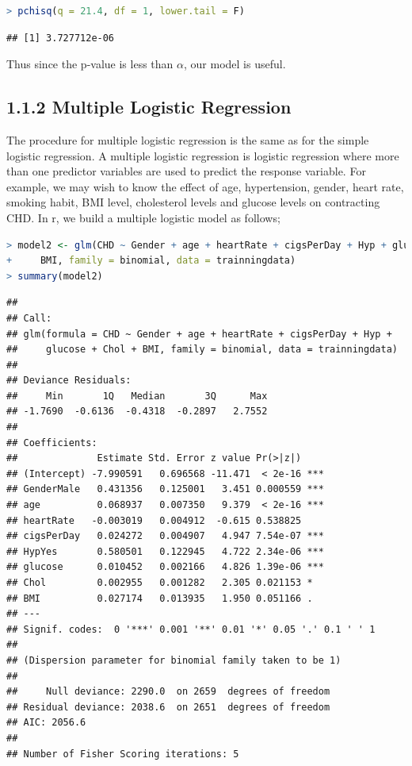 \documentclass[
]{article}
\begin{document}
\begin{lstlisting}[language=R]
> pchisq(q = 21.4, df = 1, lower.tail = F)
\end{lstlisting}

\begin{lstlisting}
## [1] 3.727712e-06
\end{lstlisting}

Thus since the p-value is less than \(\alpha\), our model is useful.

\hypertarget{multiple-logistic-regression}{%
\subsection{1.1.2 Multiple Logistic
Regression}\label{multiple-logistic-regression}}

The procedure for multiple logistic regression is the same as for the
simple logistic regression. A multiple logistic regression is logistic
regression where more than one predictor variables are used to predict
the response variable. For example, we may wish to know the effect of
age, hypertension, gender, heart rate, smoking habit, BMI level,
cholesterol levels and glucose levels on contracting CHD. In r, we build
a multiple logistic model as follows;

\begin{lstlisting}[language=R]
> model2 <- glm(CHD ~ Gender + age + heartRate + cigsPerDay + Hyp + glucose + Chol +
+     BMI, family = binomial, data = trainningdata)
> summary(model2)
\end{lstlisting}

\begin{lstlisting}
## 
## Call:
## glm(formula = CHD ~ Gender + age + heartRate + cigsPerDay + Hyp + 
##     glucose + Chol + BMI, family = binomial, data = trainningdata)
## 
## Deviance Residuals: 
##     Min       1Q   Median       3Q      Max  
## -1.7690  -0.6136  -0.4318  -0.2897   2.7552  
## 
## Coefficients:
##              Estimate Std. Error z value Pr(>|z|)    
## (Intercept) -7.990591   0.696568 -11.471  < 2e-16 ***
## GenderMale   0.431356   0.125001   3.451 0.000559 ***
## age          0.068937   0.007350   9.379  < 2e-16 ***
## heartRate   -0.003019   0.004912  -0.615 0.538825    
## cigsPerDay   0.024272   0.004907   4.947 7.54e-07 ***
## HypYes       0.580501   0.122945   4.722 2.34e-06 ***
## glucose      0.010452   0.002166   4.826 1.39e-06 ***
## Chol         0.002955   0.001282   2.305 0.021153 *  
## BMI          0.027174   0.013935   1.950 0.051166 .  
## ---
## Signif. codes:  0 '***' 0.001 '**' 0.01 '*' 0.05 '.' 0.1 ' ' 1
## 
## (Dispersion parameter for binomial family taken to be 1)
## 
##     Null deviance: 2290.0  on 2659  degrees of freedom
## Residual deviance: 2038.6  on 2651  degrees of freedom
## AIC: 2056.6
## 
## Number of Fisher Scoring iterations: 5
\end{lstlisting}
\end{document}
